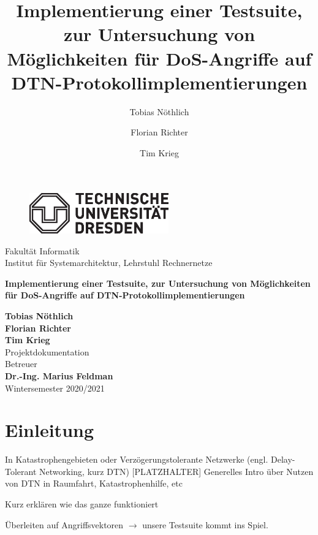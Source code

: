 \documentclass{article}
\author[1]{Tobias Nöthlich}
\author[1]{Florian Richter}
\author[1]{Tim Krieg}
\title{Implementierung einer Testsuite, zur Untersuchung von Möglichkeiten für DoS-Angriffe auf DTN-Protokollimplementierungen}
\begin{document}


\begin{titlepage}

\begin{figure}[h]
\begin{flushleft}
\includegraphics[trim= 0 0 0 0 , clip, width=6cm]{img/logo.eps} 
\end{flushleft}
\end{figure}
\noindent
Fakultät Informatik\\
Institut für Systemarchitektur, Lehrstuhl Rechnernetze \\

\begin{center}
\Huge
\textbf{Implementierung einer Testsuite, zur Untersuchung von Möglichkeiten für DoS-Angriffe auf DTN-Protokollimplementierungen} \\
\normalsize
\vspace{1cm}

\end{center}

\vspace{1cm}
\noindent
\textbf{\large{Tobias Nöthlich}} \\
\textbf{\large{Florian Richter}} \\
\textbf{\large{Tim Krieg}} \\

\vspace{1cm}
\noindent
{\LARGE Projektdokumentation} \\

\vspace{1cm}
\noindent
Betreuer\\
\textbf{\large{Dr.-Ing. Marius Feldman}} \\

\vspace{1cm}
\noindent
Wintersemester 2020/2021

\end{titlepage}
\tableofcontents

\newpage

\section{Einleitung}

In Katastrophengebieten oder Verzögerungstolerante Netzwerke (engl. Delay-Tolerant Networking, kurz DTN)  
[PLATZHALTER] Generelles Intro über Nutzen von DTN in Raumfahrt, Katastrophenhilfe, etc \par
[PLATZHALTER] Kurz erklären wie das ganze funktioniert\par
[PLATZHALTER]Überleiten auf Angriffsvektoren $\rightarrow$ unsere Testsuite kommt ins Spiel.\par
\end{document}
